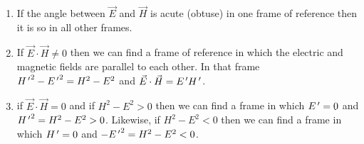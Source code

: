 \begin{enumerate}
\begin{enumerate}
\item If the angle between $\vec{E}$ and $\vec{H}$ is acute (obtuse) in one 
frame of reference then it is so in all other frames.

\item If $\vec{E}\cdot\vec{H} \ne 0$ then we can find a frame of reference
in which the electric and magnetic fields are parallel to each other. In that
frame ${H^{\,\prime}}^2 - {E^{\,\prime}}^2 = H^2 - E^2$ and $\vec{E}\cdot\vec{H} = E^{\,\prime} 
H^{\,\prime}$.

\item if $\vec{E}\cdot\vec{H} = 0$ and if $H^2 - E^2 > 0$ then we can find
a frame in which $E^{\,\prime} = 0$ and ${H^{\,\prime}}^2 = H^2 - E^2 > 0$. Likewise, if $H^2
- E^2 < 0$ then we can find a frame in which $H^{\,\prime} = 0$ and $-{E^{\,\prime}}^2 = 
H^2 - E^2 < 0$. 
\end{enumerate}
\end{enumerate}

